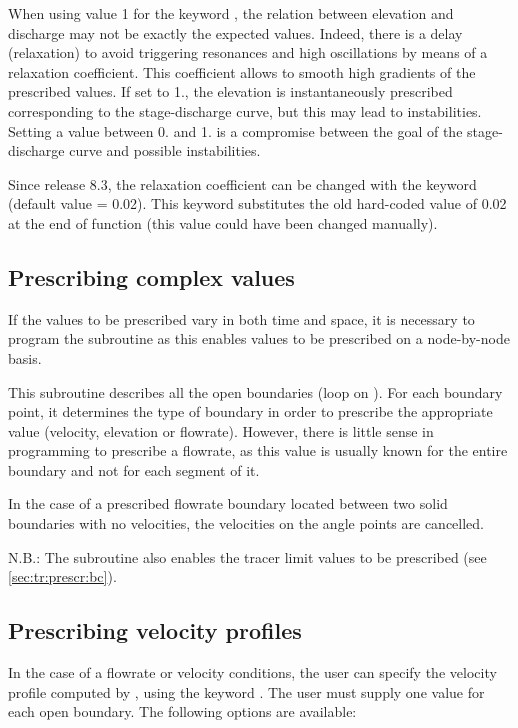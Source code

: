 When using value 1 for the keyword , the relation
between elevation and discharge may not be exactly the expected values.
Indeed, there is a delay (relaxation) to avoid triggering resonances and
high oscillations by means of a relaxation coefficient.
This coefficient allows to smooth high gradients of the prescribed values.
If set to 1., the elevation is instantaneously prescribed corresponding to the
stage-discharge curve, but this may lead to instabilities.
Setting a value between 0. and 1. is a compromise between the goal of the
stage-discharge curve and possible instabilities.

Since release 8.3, the relaxation coefficient can be changed with the keyword
 (default value = 0.02).
This keyword substitutes the old hard-coded value of 0.02 at the end of function
 (this value could have been changed manually).


\subsection{Prescribing complex values}
\label{subs:pres:compl:val}
If the values to be prescribed vary in both time and space, it is necessary
to program the  subroutine as this enables values
to be prescribed on a node-by-node basis.

This subroutine describes all the open boundaries (loop on ).
For each boundary point, it determines the type of boundary in order
to prescribe the appropriate value (velocity, elevation or flowrate).
However, there is little sense in programming  to prescribe
a flowrate, as this value is usually known for the entire boundary and not for
each segment of it.

In the case of a prescribed flowrate boundary located between two solid
boundaries with no velocities, the velocities on the angle points are cancelled.

N.B.: The  subroutine also enables the tracer limit values
to be prescribed (see \ref{sec:tr:prescr:bc}).


\subsection{Prescribing velocity profiles}
\label{subs:presc:vel:prof}
In the case of a flowrate or velocity conditions, the user can specify the
velocity profile computed by , using the keyword
.
The user must supply one value for each open boundary.
The following options are available:


